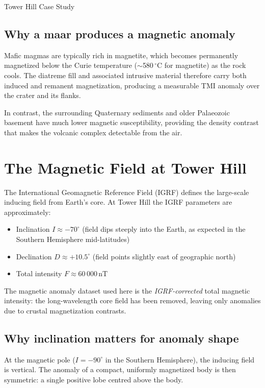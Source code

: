 \begin{activity}{Tower Hill Case Study}
\subsection{Why a maar produces a magnetic anomaly}

Mafic magmas are typically rich in magnetite, which becomes permanently
magnetized below the Curie temperature ($\sim$580\,$^{\circ}$C for magnetite)
as the rock cools.
The diatreme fill and associated intrusive material therefore carry both
induced and remanent magnetization, producing a measurable TMI anomaly
over the crater and its flanks.

In contrast, the surrounding Quaternary sediments and older Palaeozoic basement
have much lower magnetic susceptibility, providing the density contrast that
makes the volcanic complex detectable from the air.

\section{The Magnetic Field at Tower Hill}

The International Geomagnetic Reference Field (IGRF) defines the large-scale
inducing field from Earth's core.
At Tower Hill the IGRF parameters are approximately:
\begin{itemize}
  \item Inclination $I \approx -70^\circ$ (field dips steeply into the Earth,
        as expected in the Southern Hemisphere mid-latitudes)
  \item Declination $D \approx +10.5^\circ$ (field points slightly east of
        geographic north)
  \item Total intensity $F \approx 60\,000$\,nT
\end{itemize}

The magnetic anomaly dataset used here is the \emph{IGRF-corrected} total
magnetic intensity: the long-wavelength core field has been removed, leaving
only anomalies due to crustal magnetization contrasts.

\subsection{Why inclination matters for anomaly shape}

At the magnetic pole ($I = -90^\circ$ in the Southern Hemisphere), the inducing
field is vertical.
The anomaly of a compact, uniformly magnetized body is then symmetric: a
single positive lobe centred above the body.


\end{activity}
